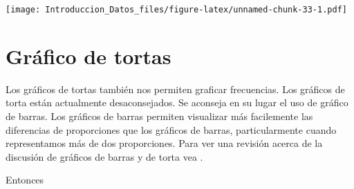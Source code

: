 \documentclass[spanish,]{book}
\begin{document}
\texttt{[image: Introduccion\_Datos\_files/figure-latex/unnamed-chunk-33-1.pdf]}

\section{Gráfico de tortas}\label{grafico-de-tortas}

Los gráficos de tortas también nos permiten graficar frecuencias. Los
gráficos de torta están actualmente desaconsejados. Se aconseja en su
lugar el uso de gráfico de barras. Los gráficos de barras permiten
visualizar más facilemente las diferencias de proporciones que los
gráficos de barras, particularmente cuando representamos más de dos
proporciones. Para ver una revisión acerca de la discusión de gráficos
de barras y de torta vea \citet{spence2005no}.

Entonces


\end{document}
